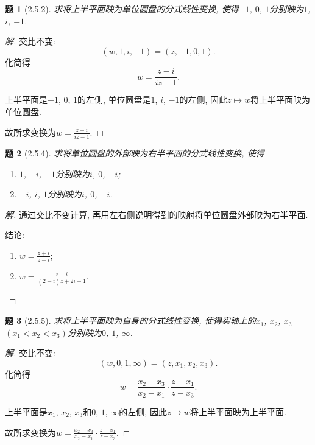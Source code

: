 \documentclass{article}[a4paper, 12pt]
\newtheorem{problem}{题}
\newenvironment{solution}{\begin{proof}[解]}{\end{proof}}
\begin{document}
\begin{problem}[2.5.2]
  求将上半平面映为单位圆盘的分式线性变换, 使得\(-1\), \(0\), \(1\)分别映为\(1\), \(i\), \(-1\).
\end{problem}

\begin{solution}
  交比不变:
  \[(w, 1, i, -1)=(z,-1,0,1).\]
  化简得
  \[w=\frac{z-i}{iz-1}.\]

  上半平面是\(-1\), \(0\), \(1\)的左侧, 单位圆盘是\(1\), \(i\), \(-1\)的左侧, 因此\(z\mapsto w\)将上半平面映为单位圆盘.

  故所求变换为\(w=\frac{z-i}{iz-1}\).
\end{solution}

\begin{problem}[2.5.4]
  求将单位圆盘的外部映为右半平面的分式线性变换, 使得
  \begin{enumerate}
    \item \(1\), \(-i\), \(-1\)分别映为\(i\), \(0\), \(-i\);
    \item \(-i\), \(i\), \(1\)分别映为\(i\), \(0\), \(-i\).
  \end{enumerate}
\end{problem}

\begin{solution}
  通过交比不变计算, 再用左右侧说明得到的映射将单位圆盘外部映为右半平面.

  结论:
  \begin{enumerate}
    \item \(w=\frac{z+i}{z-i}\);
    \item \(w=\frac{z-i}{(2-i)z+2i-1}\).
  \end{enumerate}
\end{solution}

\begin{problem}[2.5.5]
  求将上半平面映为自身的分式线性变换, 使得实轴上的\(x_1\), \(x_2\), \(x_3\) \((x_1<x_2<x_3)\)分别映为\(0\), \(1\), \(\infty\).
\end{problem}

\begin{solution}
  交比不变:
  \[(w, 0, 1, \infty)=(z,x_1,x_2,x_3).\]
  化简得
  \[w=\frac{x_2-x_3}{x_2-x_1}\cdot\frac{z-x_1}{z-x_3}.\]

  上半平面是\(x_1\), \(x_2\), \(x_3\)和\(0\), \(1\), \(\infty\)的左侧, 因此\(z\mapsto w\)将上半平面映为上半平面.

  故所求变换为\(w=\frac{x_2-x_3}{x_2-x_1}\cdot\frac{z-x_1}{z-x_3}\).
\end{solution}
\end{document}
